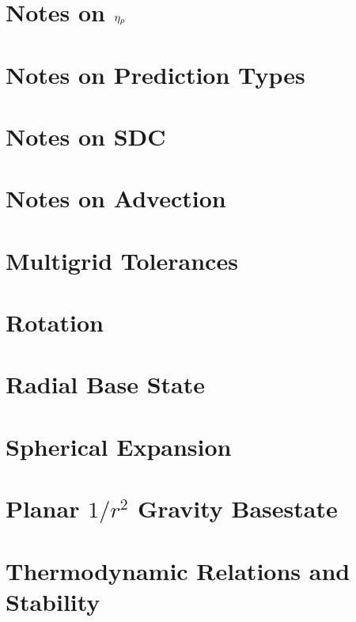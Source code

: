 \documentclass[11pt]{book}    %
\begin{document}
\chapter{Notes on $\eta_{\rho}$}


\chapter{Notes on Prediction Types}


\chapter{Notes on SDC}
\label{ch:sdc}


\chapter{Notes on Advection}


\chapter{Multigrid Tolerances}


\chapter{Rotation}


\chapter{Radial Base State}


\chapter{Spherical Expansion}


\chapter{Planar $1/r^2$ Gravity Basestate}


\chapter{Thermodynamic Relations and Stability}

\end{document}
